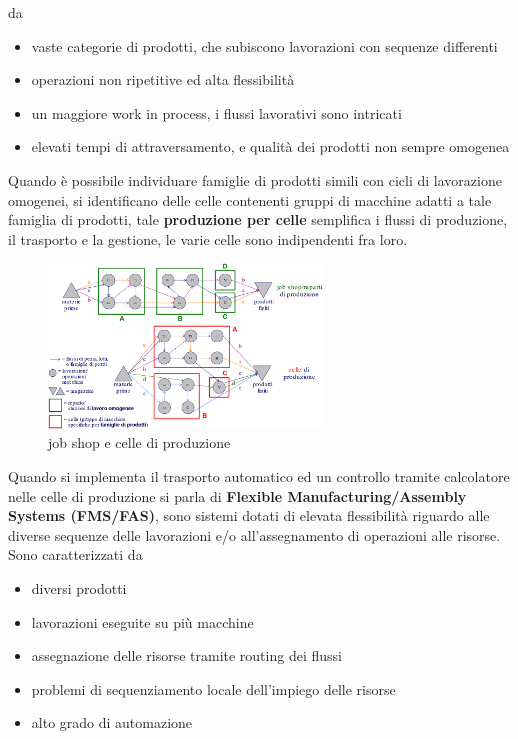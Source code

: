 \documentclass[10pt, letterpaper]{report}
\begin{document}
da \begin{itemize}
    \item vaste categorie di prodotti, che subiscono lavorazioni con sequenze differenti 
    \item operazioni non ripetitive ed alta flessibilità 
    \item un maggiore work in process, i flussi lavorativi sono intricati 
    \item elevati tempi di attraversamento, e qualità dei prodotti non sempre omogenea
\end{itemize}
Quando è possibile individuare famiglie di prodotti simili con cicli di lavorazione omogenei, si identificano delle 
celle contenenti gruppi di macchine adatti a tale famiglia di prodotti, tale \textbf{produzione per celle} semplifica 
i flussi di produzione, il trasporto e la gestione, le varie celle sono indipendenti fra loro.\acc
\begin{figure}[h!]
    \centering
    \includegraphics[width=0.65\textwidth ]{images/celleReparti.png}
    \caption{job shop e celle di produzione}
\end{figure}
Quando si implementa il trasporto automatico ed un controllo tramite calcolatore nelle celle di produzione si 
parla di \textbf{Flexible Manufacturing/Assembly Systems (FMS/FAS)}, sono sistemi dotati di elevata 
 flessibilità riguardo alle diverse sequenze delle lavorazioni 
 e/o all'assegnamento di operazioni alle risorse. Sono caratterizzati da \begin{itemize}
    \item diversi prodotti 
    \item lavorazioni eseguite su più macchine 
    \item assegnazione delle risorse tramite routing dei flussi 
    \item problemi di sequenziamento locale dell'impiego delle risorse 
    \item alto grado di automazione
 \end{itemize}
\end{document}
